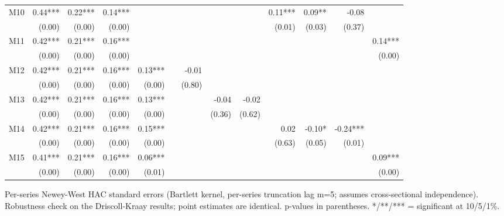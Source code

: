\begin{table}[htbp]
{\begin{tabular}{lrrrrrrrrrrrr}
M10 & 0.44*** & 0.22*** & 0.14*** &  &  &  &  &  & 0.11*** & 0.09** & -0.08 &  \\
 & (0.00) & (0.00) & (0.00) &  &  &  &  &  & (0.01) & (0.03) & (0.37) &  \\
M11 & 0.42*** & 0.21*** & 0.16*** &  &  &  &  &  &  &  &  & 0.14*** \\
 & (0.00) & (0.00) & (0.00) &  &  &  &  &  &  &  &  & (0.00) \\
M12 & 0.42*** & 0.21*** & 0.16*** & 0.13*** &  & -0.01 &  &  &  &  &  &  \\
 & (0.00) & (0.00) & (0.00) & (0.00) &  & (0.80) &  &  &  &  &  &  \\
M13 & 0.42*** & 0.21*** & 0.16*** & 0.13*** &  &  & -0.04 & -0.02 &  &  &  &  \\
 & (0.00) & (0.00) & (0.00) & (0.00) &  &  & (0.36) & (0.62) &  &  &  &  \\
M14 & 0.42*** & 0.21*** & 0.16*** & 0.15*** &  &  &  &  & 0.02 & -0.10* & -0.24*** &  \\
 & (0.00) & (0.00) & (0.00) & (0.00) &  &  &  &  & (0.63) & (0.05) & (0.01) &  \\
M15 & 0.41*** & 0.21*** & 0.16*** & 0.06*** &  &  &  &  &  &  &  & 0.09*** \\
 & (0.00) & (0.00) & (0.00) & (0.01) &  &  &  &  &  &  &  & (0.00) \\
\bottomrule
\end{tabular}%
}
\smallskip
\small
\noindent Per-series Newey-West HAC standard errors (Bartlett kernel, per-series truncation lag m=5; assumes cross-sectional independence). Robustness check on the Driscoll-Kraay results; point estimates are identical. p-values in parentheses. */**/*** = significant at 10/5/1\%.
\end{table}
